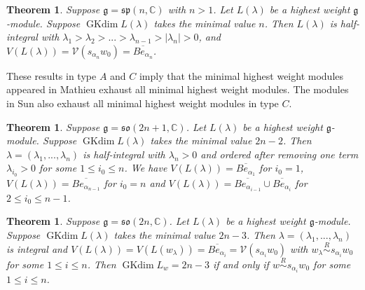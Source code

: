 \documentclass{amsart}[12pt]
\newtheorem{Thm}[Lem]{Theorem}
\newcommand{\gkd}{\operatorname{GKdim}}
\numberwithin{equation}{section}
\begin{document}

\begin{Thm}\label{m21}
		Suppose $\mathfrak{g}=\mathfrak{sp }(n, \mathbb{C})$ with $n>1$. Let $L(\lambda)$ be a highest weight $\mathfrak{g}$-module. Suppose $\gkd L(\lambda)$ takes the minimal value $n$. Then
	$L(\lambda)$ is  half-integral  with $\lambda_1>\lambda_2>...>\lambda_{n-1}>|\lambda_n|>0$,  and $V(L(\lambda))=\mathcal{V}(s_{\alpha_{n}}w_0)=\overline{Be_{\alpha_{n}}}$.
	
	
\end{Thm}

These results in type $A$ and $C$ imply that the minimal highest weight modules appeared in Mathieu \cite{Ma} exhaust all minimal highest weight modules. The modules in Sun \cite{Sun} also exhaust all  minimal highest weight modules in type $C$.


\begin{Thm}\label{m22}
	Suppose $\mathfrak{g}=\mathfrak{so }(2n+1, \mathbb{C})$. Let $L(\lambda)$ be a highest weight $\mathfrak{g}$-module. Suppose $\gkd L(\lambda)$ takes the minimal value $2n-2$. Then
$\lambda=(\lambda_1,...,\lambda_n)$ is half-integral with $\lambda_n>0$ and ordered  after removing one term $\lambda_{i_0}>0$ for some $1\leq i_0\leq n$.
We have	$V(L(\lambda))=\overline{Be_{\alpha_{1}}}$ for $i_0=1$, $V(L(\lambda))=\overline{Be_{\alpha_{n-1}}}$ for $i_0=n$ and $V(L(\lambda))=\overline{Be_{\alpha_{i-1}}}\cup \overline{Be_{\alpha_{i}}}$ for $2\leq i_0\leq n-1$.
\end{Thm}

\begin{Thm}\label{m23}
	Suppose $\mathfrak{g}=\mathfrak{so }(2n, \mathbb{C})$. Let $L(\lambda)$ be a highest weight $\mathfrak{g}$-module. Suppose $\gkd L(\lambda)$ takes the minimal value $2n-3$. Then
$\lambda=(\lambda_1,...,\lambda_n)$ is integral and $V(L(\lambda))=V(L(w_{\lambda}))=\overline{Be_{\alpha_i}}=\mathcal{V}(s_{\alpha_i}w_0)$ with $w_{\lambda}\stackrel{R}{\sim}s_{\alpha_{i}}w_0$ for some $1\leq i\leq n$. Then $\gkd L_w=2n-3$ if and only if   $w \stackrel{R}{\sim} s_{\alpha_{i}}w_0$  for some $1\leq i\leq n$.
\end{Thm}
\end{document}
